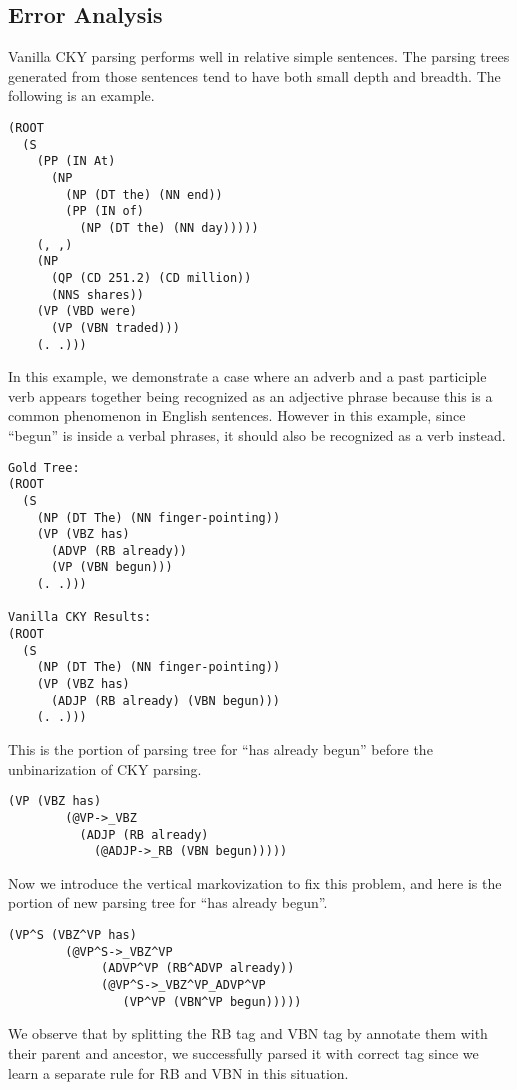 \documentclass[letterpaper]{article}
\begin{document}
\subsection{Error Analysis}
Vanilla CKY parsing performs well in relative simple sentences. The parsing trees generated from those sentences tend to have both small depth and breadth. The following is an example.
\begin{verbatim} 
(ROOT
  (S
    (PP (IN At)
      (NP
        (NP (DT the) (NN end))
        (PP (IN of)
          (NP (DT the) (NN day)))))
    (, ,)
    (NP
      (QP (CD 251.2) (CD million))
      (NNS shares))
    (VP (VBD were)
      (VP (VBN traded)))
    (. .)))
\end{verbatim}

In this example, we demonstrate a case where an adverb and a past participle verb appears together being recognized as an adjective phrase because this is a common phenomenon in English sentences. However in this example, since “begun” is inside a verbal phrases, it should also be recognized as a verb instead.
\begin{verbatim}
Gold Tree:
(ROOT
  (S
    (NP (DT The) (NN finger-pointing))
    (VP (VBZ has)
      (ADVP (RB already))
      (VP (VBN begun)))
    (. .)))
    
Vanilla CKY Results:
(ROOT
  (S
    (NP (DT The) (NN finger-pointing))
    (VP (VBZ has)
      (ADJP (RB already) (VBN begun)))
    (. .)))
\end{verbatim}

This is the portion of parsing tree for ``has already begun'' before the unbinarization of CKY parsing.
\begin{verbatim}
(VP (VBZ has)
        (@VP->_VBZ
          (ADJP (RB already)
            (@ADJP->_RB (VBN begun)))))
\end{verbatim}
Now we introduce the vertical markovization to fix this problem, and here is the portion of new parsing tree for ``has already begun''.
\begin{verbatim}
(VP^S (VBZ^VP has)
        (@VP^S->_VBZ^VP
         	 (ADVP^VP (RB^ADVP already))
          	 (@VP^S->_VBZ^VP_ADVP^VP
            	(VP^VP (VBN^VP begun)))))
\end{verbatim}
We observe that by splitting the RB tag and VBN tag by annotate them with their parent and ancestor, we successfully parsed it with correct tag since we learn a separate rule for RB and VBN in this situation.

\vspace{0.25cm}
\end{document}
